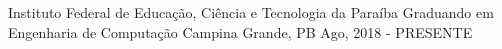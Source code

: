 
\begin{cventries}
  \cventry
    {Instituto Federal de Educação, Ciência e Tecnologia da Paraíba} %
    {Graduando em Engenharia de Computação} %
    {Campina Grande, PB} %
    {Ago, 2018 - PRESENTE} %
    {}
\end{cventries}
